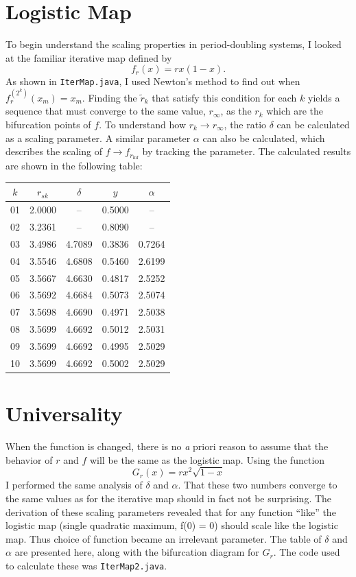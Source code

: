 \documentclass[aps,letterpaper,10pt]{article}
\newcommand{\ttt}{\texttt}
\begin{document}
\section{Logistic Map}

To begin understand the scaling properties in period-doubling systems, I looked at the familiar iterative map defined by
$$ f_r (x) = r x (1-x). $$
As shown in \ttt{IterMap.java}, I used Newton's method to find out when $f^{(2^k)}_r (x_m) = x_m.$ Finding the $\tilde{r}_k$ that satisfy this condition for each $k$ yields a sequence that must converge to the same value, $r_\infty$, as the $r_k$ which are the bifurcation points of $f$. To understand how $r_k\to r_\infty$, the ratio $\delta$ can be calculated as a scaling parameter. A similar parameter $\alpha$ can also be calculated, which describes the scaling of $f\to f_{r_\inf}$ by tracking the parameter. The calculated results are shown in the following table:

\begin{center}
\begin{tabular}{|c|c|c|c|c|}
\hline
$k$&$r_{sk}$&$\delta$&$y$&$\alpha$\\
\hline
01&2.0000&--&0.5000&--\\
02&3.2361&--&0.8090&--\\
03&3.4986&4.7089&0.3836&0.7264\\
04&3.5546&4.6808&0.5460&2.6199\\
05&3.5667&4.6630&0.4817&2.5252\\
06&3.5692&4.6684&0.5073&2.5074\\
07&3.5698&4.6690&0.4971&2.5038\\
08&3.5699&4.6692&0.5012&2.5031\\
09&3.5699&4.6692&0.4995&2.5029\\
10&3.5699&4.6692&0.5002&2.5029\\
\hline
\end{tabular}
\end{center}


\section{Universality}
When the function is changed, there is no {\emph a priori} reason to assume that the behavior of $r$ and $f$ will be the same as the logistic map. Using the function $$G_r(x) = rx^2\sqrt{1-x}$$ I performed the same analysis of $\delta$ and $\alpha$. That these two numbers converge to the same values as for the iterative map should in fact not be surprising. The derivation of these scaling parameters revealed that for any function ``like'' the logistic map (single quadratic maximum, f(0) = 0) should scale like the logistic map. Thus choice of function became an irrelevant parameter. The table of $\delta$ and $\alpha$ are presented here, along with the bifurcation diagram for $G_r$. The code used to calculate these was \ttt{IterMap2.java}.
\end{document}
